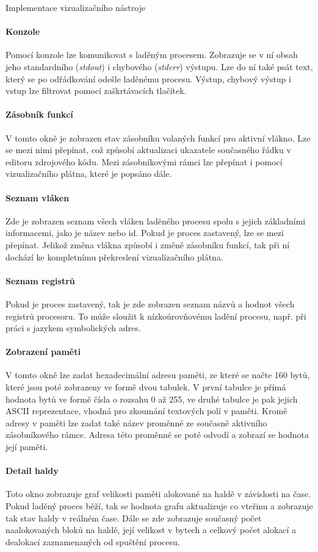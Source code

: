 \documentclass[czech,bachelor,male,python,dept460]{diploma}						%
\begin{document}
\begin{section}{Implementace vizualizačního nástroje}
	\paragraph*{Konzole} Pomocí konzole lze komunikovat s laděným procesem. Zobrazuje se v ní obsah jeho standardního (\textit{stdout}) i chybového (\textit{stderr})
		výstupu. Lze do ní také psát text, který se po odřádkování odešle laděnému procesu. Výstup, chybový výstup i vstup lze filtrovat pomocí
		zaškrtávacích tlačítek.
	\paragraph*{Zásobník funkcí} V tomto okně je zobrazen stav zásobníku volaných funkcí pro aktivní vlákno. Lze se mezi nimi přepínat, což způsobí aktualizaci
		ukazatele současného řádku v editoru zdrojového kódu. Mezi zásobníkovými rámci lze přepínat i pomocí vizualizačního plátna, které je popsáno dále.
	\paragraph*{Seznam vláken} Zde je zobrazen seznam všech vláken laděného procesu spolu s jejich základními informacemi, jako je název nebo id. Pokud je proces
		zastavený, lze se mezi přepínat. Jelikož změna vlákna způsobí i změně zásobníku funkcí, tak při ní dochází ke kompletnímu překreslení vizualizačního
		plátna.
	\paragraph*{Seznam registrů}
		Pokud je proces zastavený, tak je zde zobrazen seznam názvů a hodnot všech registrů procesoru. To může sloužit k nízkoúrovňovému ladění procesu, např.
		při práci s jazykem symbolických adres.
	\paragraph*{Zobrazení paměti} V tomto okně lze zadat hexadecimální adresu paměti, ze které se načte 160 bytů, které jsou poté zobrazeny ve formě dvou tabulek.
		V první tabulce je přímá hodnota bytů ve formě čísla o rozsahu 0 až 255, ve druhé tabulce je pak jejich ASCII reprezentace, vhodná pro zkoumání textových
		polí v paměti. Kromě adresy v paměti lze zadat také název proměnné ze současně aktivního zásobníkového rámce. Adresa této proměnné se poté odvodí
		a zobrazí se hodnota její paměti.
	\paragraph*{Detail haldy}
		Toto okno zobrazuje graf velikosti paměti alokované na haldě v závislosti na čase. Pokud laděný proces běží, tak se hodnota grafu aktualizuje co vteřinu
		a zobrazuje tak stav haldy v reálném čase. Dále se zde zobrazuje současný počet naalokovaných bloků na haldě, její velikost v bytech a celkový počet
		alokací a dealokací zaznamenaných od spuštění procesu.

\end{section}
\end{document}
